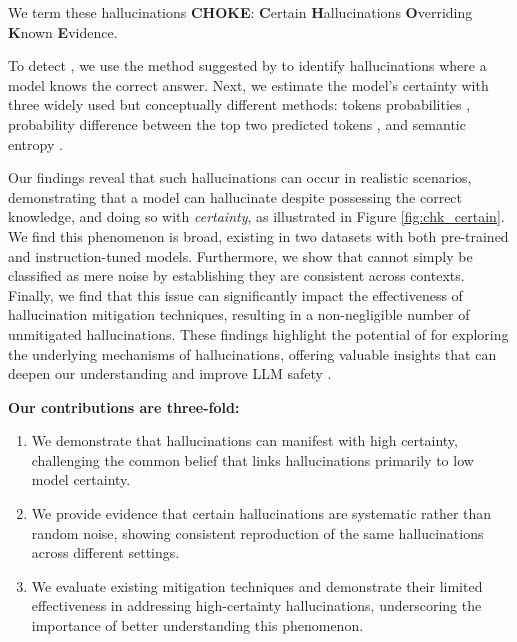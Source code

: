 
 We term these hallucinations \textbf{CHOKE}: \textbf{C}ertain \textbf{H}allucinations \textbf{O}verriding \textbf{K}nown \textbf{E}vidence.

To detect \chk, we use the method suggested by \citet{simhi2024distinguishing} to identify hallucinations where a model knows the correct answer. Next, we estimate the model's certainty with three widely used but conceptually different methods: tokens probabilities \citep{feng2024don}, probability difference between the top two predicted tokens \citep{huang2023look},  and semantic entropy \citep{kuhn2023semantic}.


Our findings reveal that such hallucinations can occur in realistic scenarios, demonstrating that a model can hallucinate despite possessing the correct knowledge, and doing so with \emph{certainty}, as illustrated in Figure \ref{fig:chk_certain}.  
We find this phenomenon is broad, existing in two datasets with both pre-trained and instruction-tuned models. Furthermore, we show that \chk cannot simply be classified as mere noise by establishing they are consistent across contexts. Finally, we find that this issue can significantly impact the effectiveness of hallucination mitigation techniques, resulting in a non-negligible number of unmitigated hallucinations.
 These findings highlight the potential of \chk for exploring the underlying mechanisms of hallucinations, offering valuable insights that can deepen our understanding and improve LLM safety \citep{barez2025open}.


\textbf{Our contributions are three-fold:}

\begin{enumerate} 
    \item We demonstrate that hallucinations can manifest with high certainty, challenging the common belief that links hallucinations primarily to low model certainty. 


    \item We provide evidence that certain hallucinations are systematic rather than random noise, showing consistent reproduction of the same hallucinations across different settings.

    \item We evaluate existing mitigation techniques and demonstrate their limited effectiveness in addressing high-certainty hallucinations, underscoring the importance of better understanding this phenomenon.
\end{enumerate}

